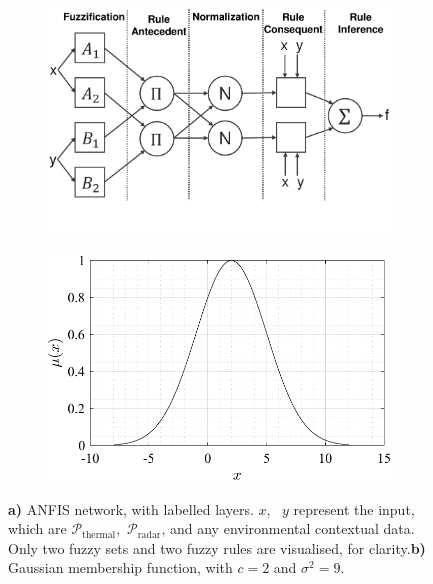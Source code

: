          \begin{figure}[htbp]
          \centering
          \begin{subfigure}[t]{0.48\textwidth} %
            \centering
            \includegraphics[width=\textwidth]{figs/Rory/ANFIS_diagram.pdf}
            \caption{}
            \label{fig:ANFIS_diagram}
          \end{subfigure}
          \hfill
          \begin{subfigure}[t]{0.48\textwidth} %
            \centering
            \includegraphics[width=\textwidth]{figs/Rory/mfs_plot.pdf}
            \caption{}
            \label{fig:membership_function_plot}
          \end{subfigure}
          \caption[ANFIS Network]{\textbf{a)} ANFIS network, with labelled layers. $x, \text{ } y$ represent the input, which are $\mathcal{P}_\text{thermal},$ $\mathcal{P}_\text{radar}$, and any environmental contextual data. Only two fuzzy sets and two fuzzy rules are visualised, for clarity.\textbf{b)} Gaussian membership function, with $c=2$ and $\sigma^2=9$.}
        \end{figure}

